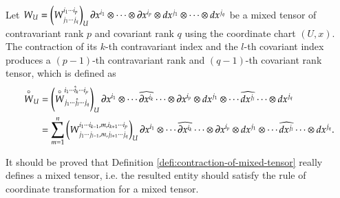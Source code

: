 \documentclass[11pt, a4paper]{book}
\begin{document}
\begin{Definition}
  \label{defi:contraction-of-mixed-tensor}
  Let
  $W_U = \left( W^{i_1 \cdots i_p}_{j_1 \cdots j_q} \right)_U \boldsymbol{\partial}x^{i_1} \otimes
  \cdots \otimes \boldsymbol{\partial}x^{i_p} \otimes dx^{j_1} \otimes \cdots \otimes dx^{j_q}$ be
  a mixed tensor of contravariant rank $p$ and covariant rank $q$ using the coordinate
  chart $(U,x)$. The contraction of its $k$-th contravariant index and the $l$-th
  covariant index produces a $(p-1)$-th contravariant rank and $(q-1)$-th covariant rank
  tensor, which is defined as
  \begin{equation}
    \label{eq:contraction-of-mixed-tensor}
    \begin{aligned}
      \overset{\circ}{W}_U &= \left( \overset{\circ}{W}^{i_1 \cdots \hat{i}_k \cdots
          i_p}_{j_1 \cdots \hat{j}_l \cdots j_q} \right)_U \boldsymbol{\partial}x^{i_1} \otimes
      \cdots \widehat{\boldsymbol{\partial}x^{i_k}} \cdots \otimes \boldsymbol{\partial}x^{i_p} \otimes
      dx^{j_1}  \otimes \cdots \widehat{dx^{j_l}} \cdots \otimes dx^{j_q} \\
      &= \sum_{m=1}^n \left( W^{i_1 \cdots i_{k-1}, m, i_{k+1} \cdots i_p}_{j_1 \cdots
          j_{l-1}, m, j_{l+1} \cdots j_{q}} \right)_U \boldsymbol{\partial}x^{i_1} \otimes \cdots
      \widehat{\boldsymbol{\partial}x^{i_k}} \cdots \otimes \boldsymbol{\partial}x^{i_p} \otimes dx^{j_1}
      \otimes \cdots \widehat{dx^{j_l}} \cdots \otimes dx^{j_q}.
    \end{aligned}
  \end{equation}
\end{Definition}
It should be proved that Definition \ref{defi:contraction-of-mixed-tensor} really defines
a mixed tensor, i.e. the resulted entity should satisfy the rule of coordinate
transformation for a mixed tensor.
\end{document}

